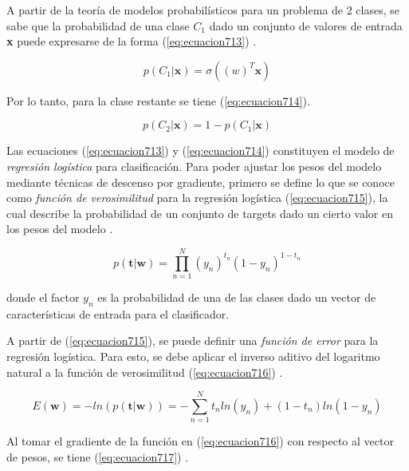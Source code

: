 
A partir de la teoría de modelos probabilísticos para un problema de 2 clases, se sabe que la probabilidad de una clase $C_1$ dado un conjunto de valores de entrada \textbf{x} puede expresarse de la forma (\ref{eq:ecuacion713}) \cite{bishop}.

\begin{equation}
	p(C_1 | \textbf{x})=\sigma ((w)^T \textbf{x})
	\label{eq:ecuacion713}
\end{equation}

Por lo tanto, para la clase restante se tiene (\ref{eq:ecuacion714}).

\begin{equation}
	p(C_2 | \textbf{x})=1-p(C_1 | \textbf{x})
	\label{eq:ecuacion714}
\end{equation}

Las ecuaciones (\ref{eq:ecuacion713}) y (\ref{eq:ecuacion714}) constituyen el modelo de \textit{regresión logística} para clasificación. Para poder ajustar los pesos del modelo mediante técnicas de descenso por gradiente, 
primero se define lo que se conoce como \textit{función de verosimilitud} para la regresión logística (\ref{eq:ecuacion715}), la cual describe la probabilidad de un conjunto de targets dado un cierto valor en los pesos del modelo \cite{bishop}.

\begin{equation}
	p(\textbf{t} | \textbf{w})=\prod_{n=1}^{N} (y_n)^{t_n} (1-y_n)^{1-t_n}
	\label{eq:ecuacion715}
\end{equation}

donde el factor $y_n$ es la probabilidad de una de las clases dado un vector de características de entrada para el clasificador.

A partir de (\ref{eq:ecuacion715}), se puede definir una \textit{función de error} para la regresión logística. Para esto, se debe aplicar el inverso aditivo del logaritmo natural a la función de verosimilitud (\ref{eq:ecuacion716}) \cite{bishop}.

\begin{equation}
	E(\textbf{w})= -ln (p(\textbf{t} | \textbf{w}))  =- \sum_{n=1}^{N} {t_n ln(y_n) + (1 - t_n) ln (1-y_n)}
	\label{eq:ecuacion716}
\end{equation}

Al tomar el gradiente de la función en (\ref{eq:ecuacion716}) con respecto al vector de pesos, se tiene (\ref{eq:ecuacion717}) \cite{bishop}.

